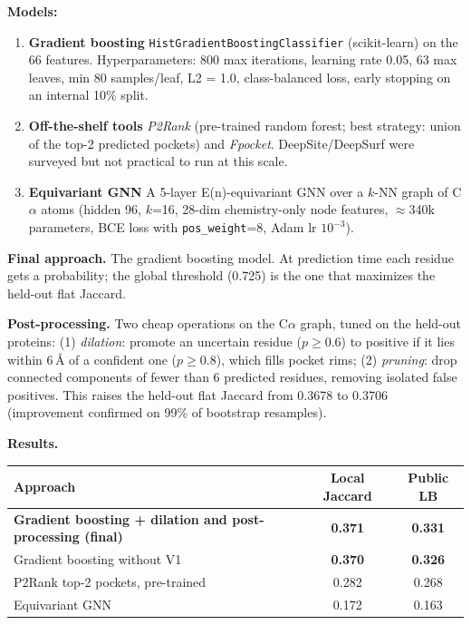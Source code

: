 \documentclass[12pt,a4paper,austrian]{article}
\begin{document}
\textbf{Models:}
\begin{enumerate}
  \item \textbf{Gradient boosting}
        \texttt{HistGradientBoostingClassifier} (scikit-learn) on the 66
        features. Hyperparameters: 800 max iterations, learning rate 0.05, 63
        max leaves, min 80 samples/leaf, L2 = 1.0, class-balanced loss, early
        stopping on an internal 10\% split.
  \item \textbf{Off-the-shelf tools} \emph{P2Rank} (pre-trained random forest;
        best strategy: union of the top-2 predicted pockets) and \emph{Fpocket}. DeepSite/DeepSurf were surveyed but not practical to run at this scale.
  \item \textbf{Equivariant GNN } A 5-layer E(n)-equivariant GNN
        over a $k$-NN graph of C$\alpha$ atoms (hidden 96, $k$=16, 28-dim
        chemistry-only node features, $\approx$340k parameters, BCE loss with
        \texttt{pos\_weight}=8, Adam lr $10^{-3}$).
\end{enumerate}

\textbf{Final approach.} The gradient boosting model. At prediction time each
residue gets a probability; the global threshold (0.725) is the one that
maximizes the held-out flat Jaccard.

\textbf{Post-processing.} Two cheap operations on the C$\alpha$ graph, tuned on
the held-out proteins: (1) \emph{dilation}: promote an uncertain residue
($p\!\ge\!0.6$) to positive if it lies within 6\,\AA{} of a confident one
($p\!\ge\!0.8$), which fills pocket rims; (2) \emph{pruning}: drop connected
components of fewer than 6 predicted residues, removing isolated false
positives. This raises the held-out flat Jaccard from 0.3678 to 0.3706
(improvement confirmed on 99\% of bootstrap resamples).

\textbf{Results.}
\begin{center}
\begin{tabular}{lcc}
\toprule
Approach & Local Jaccard & Public LB \\
\midrule
\textbf{Gradient boosting + dilation and post-processing (final)} & \textbf{0.371} & \textbf{0.331} \\
Gradient boosting without V1 & \textbf{0.370} & \textbf{0.326} \\
P2Rank top-2 pockets, pre-trained          & 0.282 & 0.268 \\
Equivariant GNN              & 0.172 & 0.163 \\
\bottomrule
\end{tabular}
\end{center}
\end{document}
